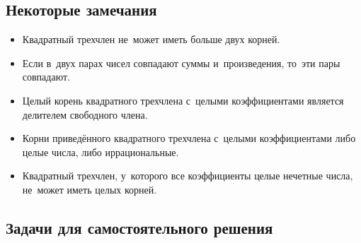 


%

\subsection*{Некоторые замечания}

\begin{itemize}
\item
Квадратный трехчлен не~может иметь больше двух корней.
\item
Если в~двух парах чисел совпадают суммы и~произведения, то~эти пары совпадают.
\item
Целый корень квадратного трехчлена с~целыми коэффициентами является делителем
свободного члена.
\item
Корни приведённого квадратного трехчлена с~целыми коэффициентами  либо целые
числа, либо иррациональные.
\item
Квадратный трехчлен, у~которого все коэффициенты целые нечетные числа, не~может
иметь целых корней.
\end{itemize}

%
%

\subsection*{Задачи для самостоятельного решения}

